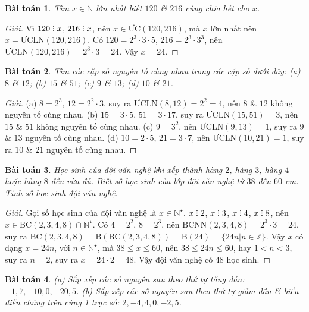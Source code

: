 \documentclass{article}
\numberwithin{equation}{section}
\newtheorem{baitoan}{Bài toán}[section]
\DeclareRobustCommand{\divby}{%
	\mathrel{\vbox{\baselineskip.65ex\lineskiplimit0pt\hbox{.}\hbox{.}\hbox{.}}}%
}
\begin{document}
\begin{baitoan}
	Tìm $x\in\mathbb{N}$ lớn nhất biết $120$ \& $216$ cùng chia hết cho $x$.
\end{baitoan}

\begin{proof}[Giải]
	Vì $120\divby x$, $216\divby x$, nên $x\in\mbox{ƯC}(120,216)$, mà $x$ lớn nhất nên $x = \mbox{ƯCLN}(120,216)$. Có $120 = 2^3\cdot3\cdot5$, $216 = 2^3\cdot3^3$, nên $\mbox{ƯCLN}(120,216) = 2^3\cdot3 = 24$. Vậy $x = 24$.
\end{proof}

\begin{baitoan}
	Tìm các cặp số nguyên tố cùng nhau trong các cặp số dưới đây: (a) $8$ \& $12$; (b) $15$ \& $51$; (c) $9$ \& $13$; (d) $10$ \& $21$.
\end{baitoan}

\begin{proof}[Giải]
	(a) $8 = 2^3$, $12 = 2^2\cdot3$, suy ra $\mbox{ƯCLN}(8,12) = 2^2 = 4$, nên $8$ \& $12$ không nguyên tố cùng nhau. (b) $15 = 3\cdot5$, $51 = 3\cdot17$, suy ra $\mbox{ƯCLN}(15,51) = 3$, nên $15$ \& $51$ không nguyên tố cùng nhau. (c) $9 = 3^2$, nên $\mbox{ƯCLN}(9,13) = 1$, suy ra $9$ \& $13$ nguyên tố cùng nhau. (d) $10 = 2\cdot5$, $21 = 3\cdot7$, nên $\mbox{ƯCLN}(10,21) = 1$, suy ra $10$ \& $21$ nguyên tố cùng nhau.
\end{proof}

\begin{baitoan}
	Học sinh của đội văn nghệ khi xếp thành hàng $2$, hàng $3$, hàng $4$ hoặc hàng $8$ đều vừa đủ. Biết số học sinh của lớp đội văn nghệ từ $38$ đến $60$ em. Tính số học sinh đội văn nghệ.
\end{baitoan}

\begin{proof}[Giải]
	Gọi số học sinh của đội văn nghệ là $x\in\mathbb{N}^\star$. $x\divby2$, $x\divby3$, $x\divby4$, $x\divby8$, nên $x\in\mbox{BC}(2,3,4,8)\cap\mathbb{N}^\star$. Có $4 = 2^2$, $8 = 2^3$, nên $\mbox{BCNN}(2,3,4,8) = 2^3\cdot3 = 24$, suy ra $\mbox{BC}(2,3,4,8) = \mbox{B}(\mbox{BC}(2,3,4,8)) = \mbox{B}(24) = \{24n|n\in\mathbb{Z}\}$. Vậy $x$ có dạng $x = 24n$, với $n\in\mathbb{N}^\star$, mà $38\le x\le 60$, nên $38\le 24n\le60$, hay $1 < n < 3$, suy ra $n = 2$, suy ra $x = 24\cdot 2 = 48$. Vậy đội văn nghệ có $48$ học sinh.
\end{proof}

\begin{baitoan}
	(a) Sắp xếp các số nguyên sau theo thứ tự tăng dần: $-1,7,-10,0,-20,5$. (b) Sắp xếp các số nguyên sau theo thứ tự giảm dần \& biểu diễn chúng trên cùng 1 trục số: $2,-4,4,0,-2,5$.
\end{baitoan}
\end{document}
